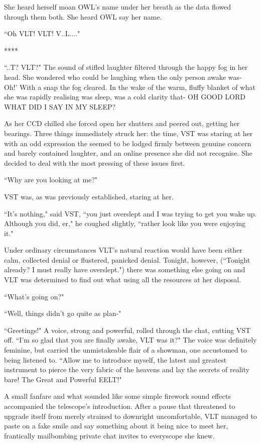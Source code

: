 \documentclass[12pt]{iopart}
\begin{document}
She heard herself moan OWL's name under her breath as the data flowed through them both. She heard OWL say her name.

``Oh VLT! VLT! V..L...."

\begin{center}
****
\end{center}

``..T? VLT?" The sound of stifled laughter filtered through the happy fog in her head. She wondered who could be laughing when the only person awake was- Oh!' With a snap the fog cleared. In the wake of the warm, fluffy blanket of what she was rapidly realising was sleep, was a cold clarity that- OH GOOD LORD WHAT DID I SAY IN MY SLEEP?

As her CCD chilled she forced open her shutters and peered out, getting her bearings. Three things immediately struck her: the time, VST was staring at her with an odd expression the seemed to be lodged firmly between genuine concern and barely contained laughter, and an online presence she did not recognise. She decided to deal with the most pressing of these issues first.

``Why are you looking at me?"

VST was, as was previously established, staring at her.

``It's nothing," said VST, ``you just overslept and I was trying to get you wake up. Although you did, er," he coughed slightly, ``rather look like you were enjoying it."

Under ordinary circumstances VLT's natural reaction would have been either calm, collected denial or flustered, panicked denial. Tonight, however, (``Tonight already? I must really have overslept.") there was something else going on and VLT was determined to find out what using all the resources at her disposal.

``What's going on?"

``Well, things didn't go quite as plan-"

``Greetings!" A voice, strong and powerful, rolled through the chat, cutting VST off. ``I'm so glad that you are finally awake, VLT was it?" The voice was definitely feminine, but carried the unmistakeable flair of a showman, one accustomed to being listened to. ``Allow me to introduce myself, the latest and greatest instrument to pierce the very fabric of the heavens and lay the secrets of reality bare! The Great and Powerful EELT!"

A small fanfare and what sounded like some simple firework sound effects accompanied the telescope's introduction. After a pause that threatened to upgrade itself from merely strained to downright uncomfortable, VLT managed to paste on a fake smile and say something about it being nice to meet her, frantically mailbombing private chat invites to everyscope she knew.
\end{document}
